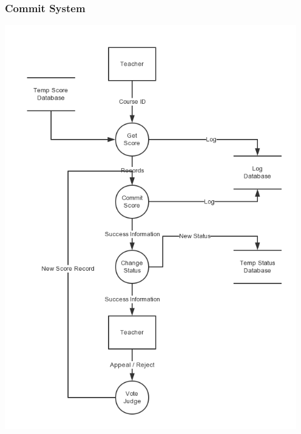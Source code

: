 \documentclass[a4]{article}
\begin{document}
\subsubsection{Commit System}
\includegraphics[width=5in]{pic/2-2.png}
\end{document}
